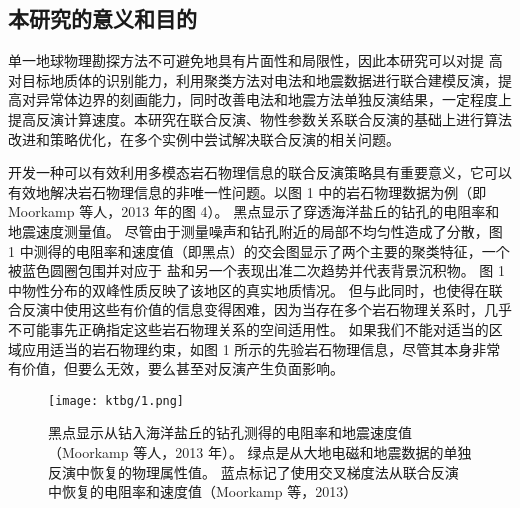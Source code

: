 \subsection{本研究的意义和目的}

单一地球物理勘探方法不可避免地具有片面性和局限性，因此本研究可以对提 高对目标地质体的识别能力，利用聚类方法对电法和地震数据进行联合建模反演，提高对异常体边界的刻画能力，同时改善电法和地震方法单独反演结果，一定程度上提高反演计算速度。本研究在联合反演、物性参数关系联合反演的基础上进行算法改进和策略优化，在多个实例中尝试解决联合反演的相关问题。

开发一种可以有效利用多模态岩石物理信息的联合反演策略具有重要意义，它可以有效地解决岩石物理信息的非唯一性问题。以图 1 中的岩石物理数据为例（即 Moorkamp 等人，2013 年的图 4）。 黑点显示了穿透海洋盐丘的钻孔的电阻率和地震速度测量值。 尽管由于测量噪声和钻孔附近的局部不均匀性造成了分散，图 1 中测得的电阻率和速度值（即黑点）的交会图显示了两个主要的聚类特征，一个被蓝色圆圈包围并对应于 盐和另一个表现出准二次趋势并代表背景沉积物。 图 1 中物性分布的双峰性质反映了该地区的真实地质情况。 但与此同时，也使得在联合反演中使用这些有价值的信息变得困难，因为当存在多个岩石物理关系时，几乎不可能事先正确指定这些岩石物理关系的空间适用性。 如果我们不能对适当的区域应用适当的岩石物理约束，如图 1 所示的先验岩石物理信息，尽管其本身非常有价值，但要么无效，要么甚至对反演产生负面影响。

\begin{figure}[H]
    \centering
    \texttt{[image: ktbg/1.png]}
    \caption[]{黑点显示从钻入海洋盐丘的钻孔测得的电阻率和地震速度值（Moorkamp 等人，2013 年）。 绿点是从大地电磁和地震数据的单独反演中恢复的物理属性值。 蓝点标记了使用交叉梯度法从联合反演中恢复的电阻率和速度值（Moorkamp 等，2013）} \label{ktbg1}
\end{figure}
